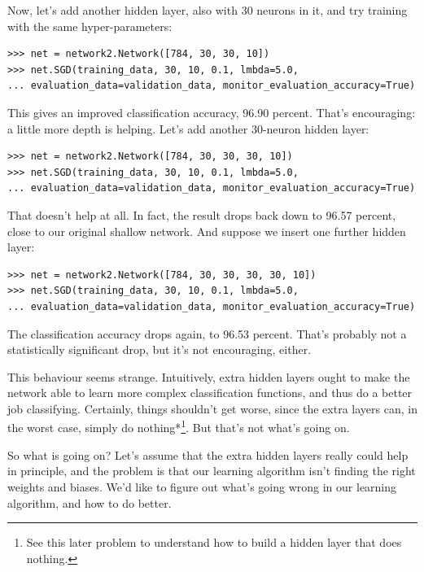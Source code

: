 Now, let's add another hidden layer, also with 30 neurons in it, and try training with the same hyper-parameters:



\begin{lstlisting}
>>> net = network2.Network([784, 30, 30, 10])
>>> net.SGD(training_data, 30, 10, 0.1, lmbda=5.0, 
... evaluation_data=validation_data, monitor_evaluation_accuracy=True)

\end{lstlisting}


This gives an improved classification accuracy, 96.90 percent. That's encouraging: a little more depth is helping. Let's add another 30-neuron hidden layer:



\begin{lstlisting}
>>> net = network2.Network([784, 30, 30, 30, 10])
>>> net.SGD(training_data, 30, 10, 0.1, lmbda=5.0, 
... evaluation_data=validation_data, monitor_evaluation_accuracy=True)

\end{lstlisting}


That doesn't help at all. In fact, the result drops back down to 96.57 percent, close to our original shallow network. And suppose we insert one further hidden layer:



\begin{lstlisting}
>>> net = network2.Network([784, 30, 30, 30, 30, 10])
>>> net.SGD(training_data, 30, 10, 0.1, lmbda=5.0, 
... evaluation_data=validation_data, monitor_evaluation_accuracy=True)

\end{lstlisting}


The classification accuracy drops again, to 96.53 percent. That's probably not a statistically significant drop, but it's not encouraging, either.


This behaviour seems strange. Intuitively, extra hidden layers ought to make the network able to learn more complex classification functions, and thus do a better job classifying. Certainly, things shouldn't get worse, since the extra layers can, in the worst case, simply do nothing*\footnote{See this later problem to understand how to build a hidden layer that does nothing.}. But that's not what's going on.


So what is going on? Let's assume that the extra hidden layers really could help in principle, and the problem is that our learning algorithm isn't finding the right weights and biases. We'd like to figure out what's going wrong in our learning algorithm, and how to do better.


